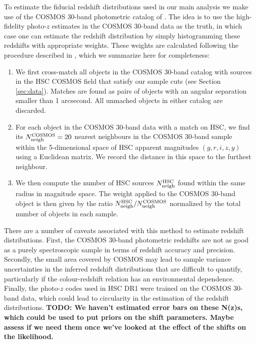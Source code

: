\documentclass[a4paper,11pt]{article}
\newcommand{\todo}[1]{{\bf TODO: #1}}
\begin{document}
    To estimate the fiducial redshift distributions used in our main analysis we make use of the COSMOS 30-band photometric catalog of \cite{2016ApJS..224...24L}. The idea is to use the high-fidelity photo-$z$ estimates in the COSMOS 30-band data as the truth, in which case one can estimate the redshift distribution by simply histogramming these redshifts with appropriate weights. These weights are calculated following the procedure described in \cite{2017MNRAS.465.1454H,2019PASJ...71...43H}, which we summarize here for completeness:
    \begin{enumerate}
      \item We first cross-match all objects in the COSMOS 30-band catalog with sources in the HSC COSMOS field that satisfy our sample cuts (see Section \ref{sec:data}). Matches are found as pairs of objects with an angular separation smaller than 1 arcsecond. All unmached objects in either catalog are discarded.
      \item For each object in the COSMOS 30-band data with a match on HSC, we find its $N_{\rm neigh}^{\rm COSMOS}=20$ nearest neighbours in the COSMOS 30-band sample within the 5-dimensional space of HSC apparent magnitudes $(g,r,i,z,y)$ using a Euclidean matrix. We record the distance in this space to the furthest neighbour.
      \item We then compute the number of HSC sources $N_{\rm neigh}^{\rm HSC}$ found within the same radius in magnitude space. The weight applied to the COSMOS 30-band object is then given by the ratio $N^{\rm HSC}_{\rm neigh}/N^{\rm COSMOS}_{\rm neigh}$ normalized by the total number of objects in each sample.
    \end{enumerate}
    There are a number of caveats associated with this method to estimate redshift distributions. First, the COSMOS 30-band photometric redshifts are not as good as a purely spectroscopic sample in terms of redshift accuracy and precision. Secondly, the small area covered by COSMOS may lead to sample variance uncertainties in the inferred redshift distributions that are difficult to quantify, particularly if the colour-redshift relation has an environmental dependence. Finally, the photo-$z$ codes used in HSC DR1 were trained on the COSMOS 30-band data, which could lead to circularity in the estimation of the redshift distributions.
    \todo{We haven't estimated error bars on these N(z)s, which could be used to put priors on the shift parameters. Maybe assess if we need them once we've looked at the effect of the shifts on the likelihood.}
    
\end{document}
